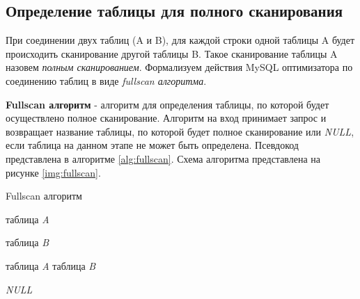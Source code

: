\subsection{Определение таблицы для полного сканирования}
\label{section:fullscan}

При соединении двух таблиц (A и B), для каждой строки одной таблицы A будет происходить сканирование другой таблицы B. Такое сканирование таблицы A назовем \textit{полным сканированием}. Формализуем действия MySQL оптимизатора \cite[p.~217]{zaitsev} по соединению таблиц в виде \textit{fullscan алгоритма}.

\textbf{Fullscan алгоритм} - алгоритм для определения таблицы, по которой будет осуществлено полное сканирование. Алгоритм на вход принимает запрос и возвращает название таблицы, по которой будет полное сканирование или \textit{NULL}, если таблица на данном этапе не может быть определена. Псевдокод представлена в алгоритме \ref{alg:fullscan}. Схема алгоритма представлена на рисунке \ref{img:fullscan}.

\begin{algorithm}[h!]
\caption{Fullscan алгоритм}
\label{alg:fullscan}
\begin{algorithmic}[1]
 
        \Else
            \State \Return таблица \textit{A}
        \EndIf
    \EndIf
    \Statex 
    
        \Else
            \State \Return таблица \textit{B}
        \EndIf
    \EndIf
    \Statex 

            \State \Return таблица \textit{A}
            \State \Return таблица \textit{B}
        \EndIf
    \EndIf
    \Statex 

    \State \Return \textit{NULL}
\EndFunction
 
\end{algorithmic}
\end{algorithm}

